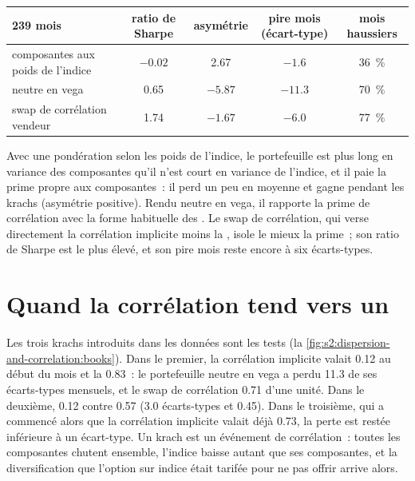 \begin{center}
\small
\begin{tabular}{@{}lcccc@{}}
\toprule
239 mois & ratio de Sharpe & asymétrie & pire mois (écart-type) & mois haussiers\\
\midrule
composantes aux poids de l'indice & $-0.02$ & 2.67 & $-1.6$ & 36~\%\\
neutre en vega & 0.65 & $-5.87$ & $-11.3$ & 70~\%\\
swap de corrélation vendeur & 1.74 & $-1.67$ & $-6.0$ & 77~\%\\
\bottomrule
\end{tabular}
\end{center}

Avec une pondération selon les poids de l'indice, le portefeuille est plus long en variance des composantes qu'il n'est court en variance de l'indice, et il paie la prime propre aux composantes~: il perd un peu en
moyenne et gagne pendant les krachs (asymétrie positive). Rendu neutre en vega, il rapporte la prime de corrélation avec la forme habituelle des . Le
swap de corrélation, qui verse directement la corrélation implicite moins la , isole le mieux la prime~; son ratio de Sharpe est le plus élevé, et son pire mois
reste encore à six écarts-types.

\section{Quand la corrélation tend vers un}

Les trois krachs introduits dans les données sont les tests (la \cref{fig:s2:dispersion-and-correlation:books}). Dans le premier, la corrélation implicite valait 0.12 au début du mois
et la  0.83~: le portefeuille neutre en vega a perdu 11.3 de ses écarts-types mensuels, et le swap de corrélation 0.71 d'une unité. Dans le deuxième,
0.12 contre 0.57 (3.0 écarts-types et 0.45). Dans le troisième, qui a commencé alors que la corrélation implicite valait déjà 0.73, la perte est restée inférieure à
un écart-type. Un krach est un événement de corrélation~: toutes les composantes chutent ensemble, l'indice baisse autant que ses composantes, et la
diversification que l'option sur indice était tarifée pour ne pas offrir arrive alors.

